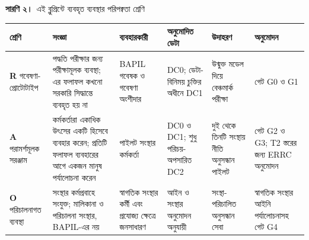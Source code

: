 \documentclass[border=10pt]{standalone}
\begin{document}
\begin{minipage}{22cm}
{\large\bfseries সারণি ২।}\ {\large এই ব্লুপ্রিন্টে ব্যবহৃত ব্যবস্থার পরিপক্বতা শ্রেণি}\par\vspace{7pt}
\small
{}
\begin{tabularx}{\linewidth}{@{}>{\hsize=0.709\hsize\raggedright\arraybackslash}X>{\hsize=1.418\hsize\raggedright\arraybackslash}X>{\hsize=0.927\hsize\raggedright\arraybackslash}X>{\hsize=0.927\hsize\raggedright\arraybackslash}X>{\hsize=1.036\hsize\raggedright\arraybackslash}X>{\hsize=0.982\hsize\raggedright\arraybackslash}X@{}}
\arrayrulecolor{bapilrule}\toprule
\rowcolor{white}\textbf{শ্রেণি} & \textbf{সংজ্ঞা} & \textbf{ব্যবহারকারী} & \textbf{অনুমোদিত ডেটা} & \textbf{উদাহরণ} & \textbf{অনুমোদন} \\
\midrule
\textbf{R} গবেষণা-প্রোটোটাইপ & পদ্ধতি পরীক্ষার জন্য পরীক্ষামূলক ব্যবস্থা; এর ফলাফল কখনো সরকারি সিদ্ধান্তে ব্যবহৃত হয় না & BAPIL গবেষক ও গবেষণা অংশীদার & DC0; ডেটা-বিনিময় চুক্তির অধীনে DC1 & উন্মুক্ত মডেল দিয়ে বেঞ্চমার্ক পরীক্ষা & গেট G0 ও G1 \\
\textbf{A} পরামর্শমূলক সরঞ্জাম & কর্মকর্তারা একাধিক উৎসের একটি হিসেবে ব্যবহার করেন; প্রতিটি ফলাফল ব্যবহারের আগে একজন মানুষ পর্যালোচনা করেন & পাইলট সংস্থার কর্মকর্তা & DC0 ও DC1; শুধু পরিচয়-অপসারিত DC2 & দুই থেকে তিনটি সংস্থায় নীতি অনুসন্ধান পাইলট & গেট G2 ও G3; T2 স্তরের জন্য ERRC অনুমোদন \\
\textbf{O} পরিচালনাগত ব্যবস্থা & সংস্থার কর্মপ্রবাহে সংযুক্ত; মালিকানা ও পরিচালনা সংস্থার, BAPIL-এর নয় & স্বাগতিক সংস্থার কর্মী এবং প্রযোজ্য ক্ষেত্রে জনসাধারণ & আইন ও সংস্থার অনুমোদন অনুযায়ী & সংস্থা-পরিচালিত অনুসন্ধান সেবা & স্বাগতিক সংস্থার আইনি পর্যালোচনাসহ গেট G4 \\
\bottomrule
\end{tabularx}
\par{}
\end{minipage}
\end{document}
